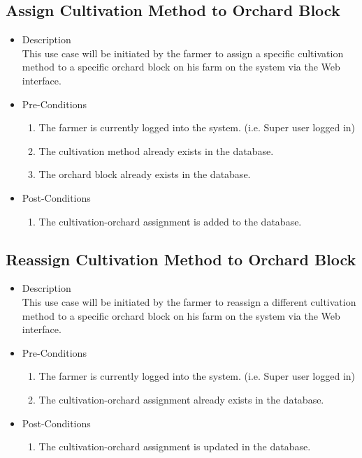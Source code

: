 \documentclass[11pt,fleqn]{book} %
\begin{document}
	\subsection{Assign Cultivation Method to Orchard Block}
	\begin{itemize}
		\item Description\\
		This use case will be initiated by the farmer to assign a specific cultivation method to a specific orchard block on his farm on the system via the Web interface.
		\item Pre-Conditions
		\begin{enumerate}
			\item The farmer is currently logged into the system. (i.e. Super user logged in)
			\item The cultivation method already exists in the database. 
			\item The orchard block already exists in the database. 									
		\end{enumerate}
		\item Post-Conditions
		\begin{enumerate}
			\item The cultivation-orchard assignment is added to the database.
		\end{enumerate}
	\end{itemize}
	
	\subsection{Reassign Cultivation Method to Orchard Block}
	\begin{itemize}
		\item Description\\
		This use case will be initiated by the farmer to reassign a different cultivation method to a specific orchard block on his farm on the system via the Web interface.
		\item Pre-Conditions
		\begin{enumerate}
			\item The farmer is currently logged into the system. (i.e. Super user logged in)
			\item The cultivation-orchard assignment already exists in the database.				
		\end{enumerate}
		\item Post-Conditions
		\begin{enumerate}
			\item The cultivation-orchard assignment is updated in the database.
		\end{enumerate}
	\end{itemize}
	
\end{document}
